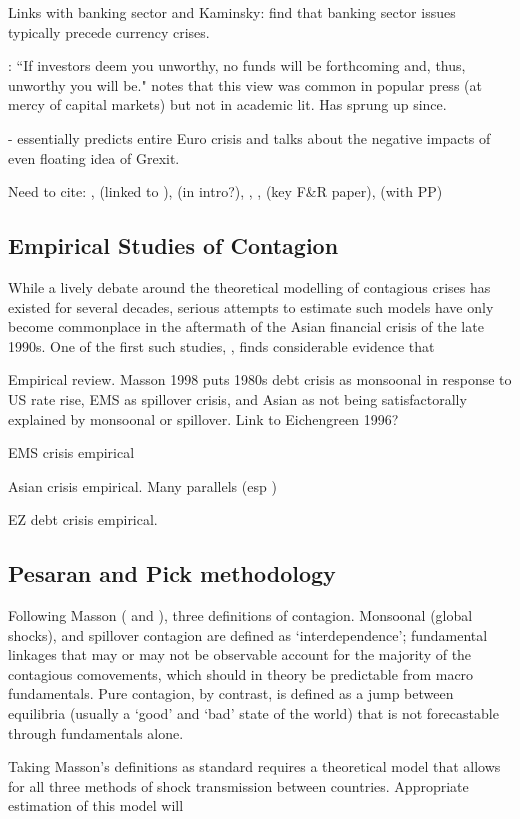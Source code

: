 \documentclass[../base.tex]{subfiles}
\begin{document}
Links with banking sector \cite{alter2012credit} and \cite{kaminsky1999twin}
Kaminsky: find that banking sector issues typically precede currency crises.

\cite{calvo1995varieties}: ``If investors deem you unworthy, no funds will be forthcoming and, thus, unworthy you will be." notes that this view was common in popular press (at mercy of capital markets) but not in academic lit. Has sprung up since. 




\cite{obstfeld1997destabilizing} - essentially predicts entire Euro crisis and talks about the negative impacts of even floating idea of Grexit.












Need to cite: , \cite{brutti2012transmission} (linked to \cite{romer1989does}), \cite{whelan2013sovereign} (in intro?), \cite{forbes2000contagion}, \cite{forbes2001measuring}, \cite{forbes2002no} (key F\&R paper), \cite{metiu2012sovereign} (with PP)


\subsection{Empirical Studies of Contagion}

While a lively debate around the theoretical modelling of contagious crises has existed for several decades, serious attempts to estimate such models have only become commonplace in the aftermath of the Asian financial crisis of the late 1990s. One of the first such studies, \cite{eichengreen1996contagious}, finds considerable evidence that 



Empirical review. Masson 1998 puts 1980s debt crisis as monsoonal in response to US rate rise, EMS as spillover crisis, and Asian as not being satisfactorally explained by monsoonal or spillover. Link to Eichengreen 1996?

EMS crisis empirical

Asian crisis empirical. Many parallels (esp \cite{kaminsky1999twin})

EZ debt crisis empirical. 




\subsection{Pesaran and Pick methodology}
Following Masson (\cite{masson1998contagion} and \cite{masson1999contagion}), three definitions of contagion. Monsoonal (global shocks), and spillover contagion are defined as `interdependence'; fundamental linkages that may or may not be observable account for the majority of the contagious comovements, which should in theory be predictable from macro fundamentals. Pure contagion, by contrast, is defined as a jump between equilibria (usually a `good' and `bad' state of the world) that is not forecastable through fundamentals alone. 

Taking Masson's definitions as standard requires a theoretical model that allows for all three methods of shock transmission between countries. Appropriate estimation of this model will 

\cite{pesaran2007econometric}
\end{document}
